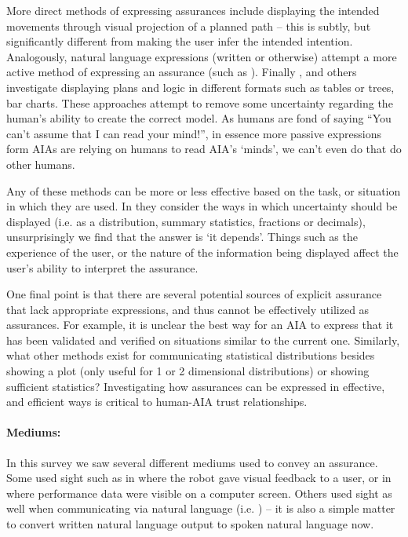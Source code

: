     More direct methods of expressing assurances include displaying the intended movements through visual projection of a planned path \cite{Chadalavada2015-wx} -- this is subtly, but significantly different from making the user infer the intended intention. Analogously, natural language expressions (written or otherwise) attempt a more active method of expressing an assurance (such as \cite{Wang2016-id}). Finally 
    \cite{Van_Belle2013-ph, Huysmans2011-th, Hutchins2015-if}, and others investigate displaying plans and logic in different formats such as tables or trees, bar charts. These approaches attempt to remove some uncertainty regarding the human's ability to create the correct model. As humans are fond of saying ``You can't assume that I can read your mind!'', in essence more passive expressions form AIAs are relying on humans to read AIA's `minds', we can't even do that do other humans.

    Any of these methods can be more or less effective based on the task, or situation in which they are used. In \cite{Chen2014-dk,Wallace2001-fm,Kuhn1997-qc,Lacave2002-cu} they consider the ways in which uncertainty should be displayed (i.e. as a distribution, summary statistics, fractions or decimals), unsurprisingly we find that the answer is `it depends'. Things such as the experience of the user, or the nature of the information being displayed affect the user's ability to interpret the assurance.

    One final point is that there are several potential sources of explicit assurance that lack appropriate expressions, and thus cannot be effectively utilized as assurances. For example, it is unclear the best way for an AIA to express that it has been validated and verified on situations similar to the current one. Similarly, what other methods exist for communicating statistical distributions besides showing a plot (only useful for 1 or 2 dimensional distributions) or showing sufficient statistics? Investigating how assurances can be expressed in effective, and efficient ways is critical to human-AIA trust relationships.

    \paragraph{Mediums:} In this survey we saw several different mediums used to convey an assurance. Some used sight such as in \cite{Chadalavada2015-wx} where the robot gave visual feedback to a user, or in \cite{Muir1996-gt} where performance data were visible on a computer screen. Others used sight as well when communicating via natural language (i.e. \cite{Wang2016-id}) -- it is also a simple matter to convert written natural language output to spoken natural language now.
    
